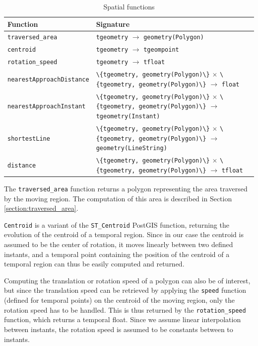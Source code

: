 \begin{table}[htb]
    \centering
    \begin{tabularx}{\textwidth}{|l|X|}
    \hline
    \textbf{Function}   & \textbf{Signature} \\ 
    \hline
    \lstinline+traversed_area+      & \lstinline+tgeometry+ $\rightarrow$ \lstinline+geometry(Polygon)+\\
    \hline
    \lstinline+centroid+            & \lstinline+tgeometry+ $\rightarrow$ \lstinline+tgeompoint+\\
    \hline
    \lstinline+rotation_speed+      & \lstinline+tgeometry+ $\rightarrow$ \lstinline+tfloat+ \\
    \hline
    \lstinline+nearestApproachDistance+ & \lstinline+\{tgeometry, geometry(Polygon)\}+ $\times$ \lstinline+\{tgeometry, geometry(Polygon)\}+ $\rightarrow$ \lstinline+float+ \\
    \hline
    \lstinline+nearestApproachInstant+  & \lstinline+\{tgeometry, geometry(Polygon)\}+ $\times$ \lstinline+\{tgeometry, geometry(Polygon)\}+ $\rightarrow$ \lstinline+tgeometry(Instant)+ \\
    \hline
    \lstinline+shortestLine+         & \lstinline+\{tgeometry, geometry(Polygon)\}+ $\times$ \lstinline+\{tgeometry, geometry(Polygon)\}+ $\rightarrow$ \lstinline+geometry(LineString)+ \\
    \hline
    \lstinline+distance+         & \lstinline+\{tgeometry, geometry(Polygon)\}+ $\times$ \lstinline+\{tgeometry, geometry(Polygon)\}+ $\rightarrow$ \lstinline+tfloat+ \\
    \hline
    \end{tabularx}
    \caption{Spatial functions}
    \label{table:spatial_funcs}
\end{table}

The \lstinline{traversed_area} function returns a polygon representing the area traversed by the moving region. The computation of this area is described in Section \ref{section:traversed_area}.

\lstinline{Centroid} is a variant of the \lstinline{ST_Centroid} PostGIS function, returning the evolution of the centroid of a temporal region. Since in our case the centroid is assumed to be the center of rotation, it moves linearly between two defined instants, and a temporal point containing the position of the centroid of a temporal region can thus be easily computed and returned.

Computing the translation or rotation speed of a polygon can also be of interest, but since the translation speed can be retrieved by applying the \lstinline{speed} function (defined for temporal points) on the centroid of the moving region, only the rotation speed has to be handled. This is thus returned by the \lstinline{rotation_speed} function, which returns a temporal float. Since we assume linear interpolation between instants, the rotation speed is assumed to be constants between to instants.

